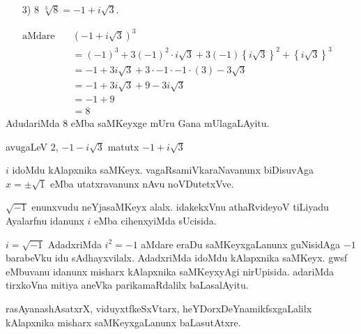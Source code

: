 \begin{itemize}
\item[{\rm 3)}] $8$  $\sqrt[3]{8} = -1 +i\sqrt{3}$.\\[-0.7cm]
\end{itemize}
\begin{align*}
\text{aMdare}\quad &(-1+i\sqrt{3})^3&\\
&= (-1)^3 + 3(-1)^2\cdot i\sqrt{3}+3(-1)\left\{i\sqrt{3}\right\}^2 + \left\{i\sqrt{3}\right\}^3\\
&= -1 + 3i\sqrt{3} +3\cdot -1\cdot -1 \cdot (3) - 3\sqrt{3}\\
&= -1+3i\sqrt{3}+9 -3i\sqrt{3}\\
&= -1+9\\
&= 8
\end{align*}
AdudariMda $8$ eMba saMKeyxge mUru Gana mUlagaLAyitu.

\smallskip
avugaLeV $2$, $-1-i\sqrt{3}$ \;matutx\; $-1+i\sqrt{3}$ 

$i$ idoMdu kAlapxnika saMKeyx. vagaRsamiVkaraNavanunx biDisuvAga $x =\pm \sqrt{1}$ eMba utatxravanunx nAvu noVDutetxVve.

\medskip
$\sqrt{-1}$ enunxvudu neYjasaMKeyx alalx. idakekxVnu athaRvideyoV tiLiyadu Ayalarfnu idanunx $i$ eMba cihenxyiMda sUcisida.

\medskip
$i=\sqrt{-1}$ AdadxriMda $i^2=-1$ aMdare eraDu saMKeyxgaLanunx guNisidAga $-1$ barabeVku idu sAdhayxvilalx. AdadxriMda idoMdu kAlapxnika saMKeyx. gwsf eMbuvanu idanunx misharx kAlapxnika saMKeyxyAgi nirUpisida. adariMda tirxkoVna mitiya aneVka parikamaRdalilx baLasalAyitu.

rasAyanashAsatxrX, viduyxtfkeSxVtarx, heYDorxDeYnamikfsxgaLalilx kAlapxnika misharx saMKeyx\-gaLanunx baLasutAtxre.
